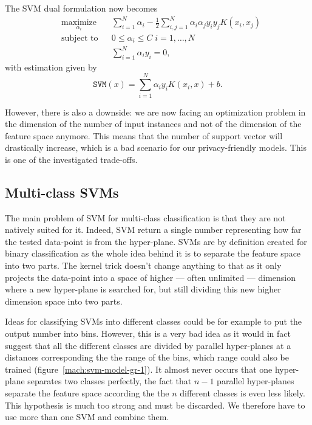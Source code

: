 The SVM dual formulation now becomes
\begin{equation}
    \begin{aligned}
& \underset{\alpha_i}{\text{maximize}} 
& & \sum_{i=1}^N \alpha_i - \frac12 \sum_{i,j=1}^N \alpha_i \alpha_j y_i y_j K(x_i, x_j) \\
& \text{subject to}
& & 0 \leq \alpha_i \leq C \; i = 1, \ldots, N \\
& 
& & \sum_{i=1}^N\alpha_i y_i = 0,
\end{aligned}
\end{equation}
with estimation given by
\begin{equation}
    \mathtt{SVM}(x) = \sum_{i=1}^N \alpha_i y_i K(x_i,x) + b.
\end{equation}

However, there is also a downside: we are now facing an optimization problem in the dimension of the number of input instances and not of the dimension of the feature space anymore. This means that the number of support vector will drastically increase, which is a bad scenario for our privacy-friendly models. This is one of the investigated trade-offs.


\subsection{Multi-class SVMs}
The main problem of SVM for multi-class classification is that they are not natively suited for it. Indeed, SVM return a single number representing how far the tested data-point is from the hyper-plane. SVMs are by definition created for binary classification as the whole idea behind it is to separate the feature space into two parts. The kernel trick doesn't change anything to that as it only projects the data-point into a space of higher --- often unlimited --- dimension where a new hyper-plane is searched for, but still dividing this new higher dimension space into two parts.

Ideas for classifying SVMs into different classes could be for example to put the output number into bins. However, this is a very bad idea as it would in fact suggest that all the different classes are divided by parallel hyper-planes at a distances corresponding the the range of the bins, which range could also be trained (figure~\ref{mach:svm-model-gr-1}). It almost never occurs that one hyper-plane separates two classes perfectly, the fact that $n-1$ parallel hyper-planes separate the feature space according the the $n$ different classes is even less likely. This hypothesis is much too strong and must be discarded. We therefore have to use more than one SVM and combine them.

